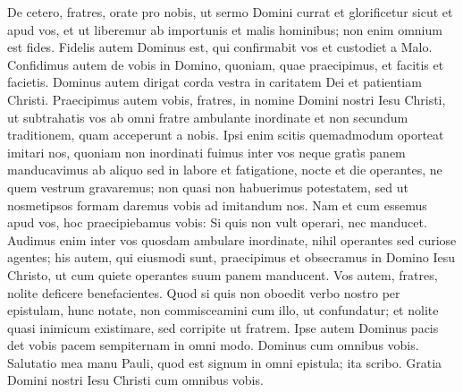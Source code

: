 \begin{biblechapter} 
\verse De cetero, fratres, orate pro nobis, ut sermo Domini currat et glorificetur sicut et apud vos, 
\verse et ut liberemur ab importunis et malis hominibus; non enim omnium est fides. 
\verse Fidelis autem Dominus est, qui confirmabit vos et custodiet a Malo. 
\verse Confidimus autem de vobis in Domino, quoniam, quae praecipimus, et facitis et facietis. 
\verse Dominus autem dirigat corda vestra in caritatem Dei et patientiam Christi. 
\verse Praecipimus autem vobis, fratres, in nomine Domini nostri Iesu Christi, ut subtrahatis vos ab omni fratre ambulante inordinate et non secundum traditionem, quam acceperunt a nobis. 
\verse Ipsi enim scitis quemadmodum oporteat imitari nos, quoniam non inordinati fuimus inter vos 
\verse neque gratìs panem manducavimus ab aliquo sed in labore et fatigatione, nocte et die operantes, ne quem vestrum gravaremus; 
\verse non quasi non habuerimus potestatem, sed ut nosmetipsos formam daremus vobis ad imitandum nos. 
\verse Nam et cum essemus apud vos, hoc praecipiebamus vobis: Si quis non vult operari, nec manducet. 
\verse Audimus enim inter vos quosdam ambulare inordinate, nihil operantes sed curiose agentes; 
\verse his autem, qui eiusmodi sunt, praecipimus et obsecramus in Domino Iesu Christo, ut cum quiete operantes suum panem manducent. 
\verse Vos autem, fratres, nolite deficere benefacientes. 
\verse Quod si quis non oboedit verbo nostro per epistulam, hunc notate, non commisceamini cum illo, ut confundatur; 
\verse et nolite quasi inimicum existimare, sed corripite ut fratrem. 
\verse Ipse autem Dominus pacis det vobis pacem sempiternam in omni modo. Dominus cum omnibus vobis. 
\verse Salutatio mea manu Pauli, quod est signum in omni epistula; ita scribo. 
\verse Gratia Domini nostri Iesu Christi cum omnibus vobis.
\end{biblechapter}
